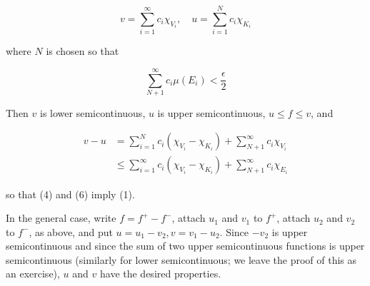 \documentclass[10pt]{article}
\begin{document}
$$
v=\sum_{i=1}^{\infty} c_{i} \chi_{V_{i}}, \quad u=\sum_{i=1}^{N} c_{i} \chi_{K_{i}}
$$

where $N$ is chosen so that

$$
\sum_{N+1}^{\infty} c_{i} \mu\left(E_{i}\right)<\frac{\epsilon}{2}
$$

Then $v$ is lower semicontinuous, $u$ is upper semicontinuous, $u \leq f \leq v$, and

$$
\begin{aligned}
v-u & =\sum_{i=1}^{N} c_{i}\left(\chi_{V_{i}}-\chi_{K_{i}}\right)+\sum_{N+1}^{\infty} c_{i} \chi_{V_{i}} \\
& \leq \sum_{i=1}^{\infty} c_{i}\left(\chi_{V_{i}}-\chi_{K_{i}}\right)+\sum_{N+1}^{\infty} c_{i} \chi_{E_{i}}
\end{aligned}
$$

so that (4) and (6) imply (1).

In the general case, write $f=f^{+}-f^{-}$, attach $u_{1}$ and $v_{1}$ to $f^{+}$, attach $u_{2}$ and $v_{2}$ to $f^{-}$, as above, and put $u=u_{1}-v_{2}, v=v_{1}-u_{2}$. Since $-v_{2}$ is upper semicontinuous and since the sum of two upper semicontinuous functions is upper semicontinuous (similarly for lower semicontinuous; we leave the proof of this as an exercise), $u$ and $v$ have the desired properties.
\end{document}
